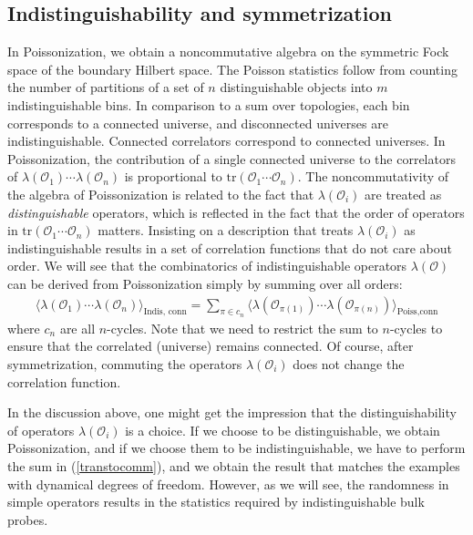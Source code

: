 \documentclass[a4paper,11pt]{article}
\theoremstyle{definition}
\numberwithin{equation}{section}
\begin{document}
\subsection{Indistinguishability and symmetrization}\label{subsec:indistinguish}

In Poissonization, we obtain a noncommutative algebra on the symmetric Fock space of the boundary Hilbert space. The Poisson statistics follow from counting the number of partitions of a set of $n$ distinguishable objects into $m$ indistinguishable bins. In comparison to a sum over topologies, each bin corresponds to a connected universe, and disconnected universes are indistinguishable. Connected correlators correspond to connected universes. In Poissonization, the contribution of a single connected universe to the correlators of $\lambda(\mathcal{O}_1)\cdots \lambda(\mathcal{O}_n)$ is proportional to $\text{tr}(\mathcal{O}_1\cdots \mathcal{O}_n)$. The noncommutativity of the algebra of Poissonization is related to the fact that $\lambda(\mathcal{O}_i)$ are treated as {\it distinguishable} operators, which is reflected in the fact that the order of operators in $\text{tr}(\mathcal{O}_1\cdots \mathcal{O}_n)$ matters. Insisting on a description that treats $\lambda(\mathcal{O}_i)$ as indistinguishable results in a set of correlation functions that do not care about order. We will see that the combinatorics of indistinguishable operators $\lambda(\mathcal{O})$ can be derived from Poissonization simply by summing over all orders:
\begin{eqnarray}\label{transtocomm}
    \langle \lambda(\mathcal{O}_1)\cdots \lambda(\mathcal{O}_n)\rangle_\text{Indis, conn}=\sum_{\pi\in c_n}\langle \lambda(\mathcal{O}_{\pi(1)})\cdots \lambda(\mathcal{O}_{\pi(n)})\rangle_\text{Poiss,conn} 
\end{eqnarray}
where $c_n$ are all $n$-cycles. Note that we need to restrict the sum to $n$-cycles to ensure that the correlated (universe) remains connected. Of course, after symmetrization, commuting the operators $\lambda(\mathcal{O}_i)$ does not change the correlation function.

In the discussion above, one might get the impression that the distinguishability of operators $\lambda(\mathcal{O}_i)$ is a choice. If we choose to be distinguishable, we obtain Poissonization, and if we choose them to be indistinguishable, we have to perform the sum in (\ref{transtocomm}), and we obtain the result that matches the examples with dynamical degrees of freedom. However, as we will see, the randomness in simple operators results in the statistics required by indistinguishable bulk probes.
\end{document}
